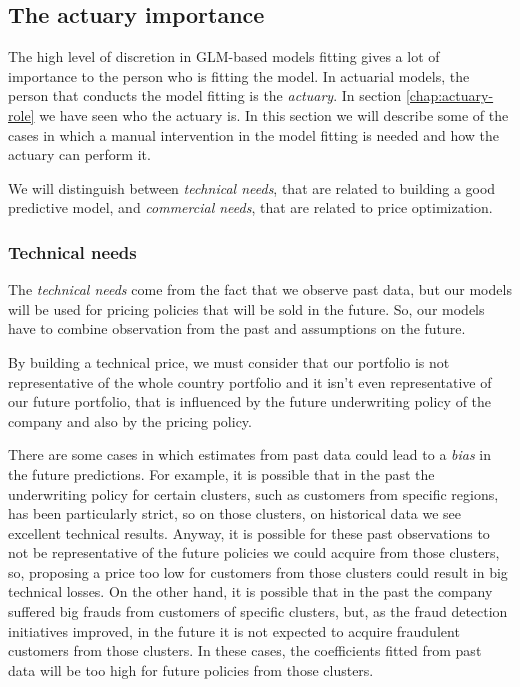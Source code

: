 \documentclass[a4paper, twoside, openright, 12pt]{report}
\theoremstyle{definition}
\theoremstyle{definition}
\theoremstyle{definition}
\theoremstyle{remark}
\begin{document}
\hypertarget{chap:actuary-importance}{%
\subsection{The actuary importance}\label{chap:actuary-importance}}

The high level of discretion in GLM-based models fitting gives a lot of importance to the person who is fitting the model. In actuarial models, the person that conducts the model fitting is the \emph{actuary}. In section \ref{chap:actuary-role} we have seen who the actuary is. In this section we will describe some of the cases in which a manual intervention in the model fitting is needed and how the actuary can perform it.

We will distinguish between \emph{technical needs}, that are related to building a good predictive model, and \emph{commercial needs}, that are related to price optimization.

\hypertarget{technical-needs}{%
\subsubsection{Technical needs}\label{technical-needs}}

The \emph{technical needs} come from the fact that we observe past data, but our models will be used for pricing policies that will be sold in the future. So, our models have to combine observation from the past and assumptions on the future.

By building a technical price, we must consider that our portfolio is not representative of the whole country portfolio and it isn't even representative of our future portfolio, that is influenced by the future underwriting policy of the company and also by the pricing policy.

There are some cases in which estimates from past data could lead to a \emph{bias} in the future predictions. For example, it is possible that in the past the underwriting policy for certain clusters, such as customers from specific regions, has been particularly strict, so on those clusters, on historical data we see excellent technical results. Anyway, it is possible for these past observations to not be representative of the future policies we could acquire from those clusters, so, proposing a price too low for customers from those clusters could result in big technical losses. On the other hand, it is possible that in the past the company suffered big frauds from customers of specific clusters, but, as the fraud detection initiatives improved, in the future it is not expected to acquire fraudulent customers from those clusters. In these cases, the coefficients fitted from past data will be too high for future policies from those clusters.
\end{document}
